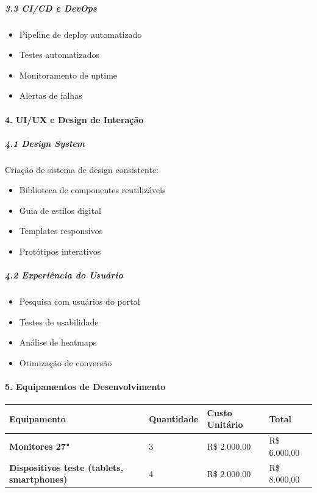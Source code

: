 \subparagraph{3.3 CI/CD e DevOps}

\begin{itemize}
\item Pipeline de deploy automatizado
\item Testes automatizados
\item Monitoramento de uptime
\item Alertas de falhas
\end{itemize}

\paragraph{4. UI/UX e Design de Interação}

\subparagraph{4.1 Design System}

Criação de sistema de design consistente:

\begin{itemize}
\item Biblioteca de componentes reutilizáveis
\item Guia de estilos digital
\item Templates responsivos
\item Protótipos interativos
\end{itemize}

\subparagraph{4.2 Experiência do Usuário}

\begin{itemize}
\item Pesquisa com usuários do portal
\item Testes de usabilidade
\item Análise de heatmaps
\item Otimização de conversão
\end{itemize}

\paragraph{5. Equipamentos de Desenvolvimento}

\bigskip\noindent
\begin{tabular}{p{}p{}p{}p{}}
\toprule
Equipamento & Quantidade & Custo Unitário & Total \\
\hline
\textbf{Monitores 27"} & 3 & R\$ 2.000,00 & R\$ 6.000,00 \\
\textbf{Dispositivos teste (tablets, smartphones)} & 4 & R\$ 2.000,00 & R\$ 8.000,00 \\
\bottomrule
\end{tabular}

